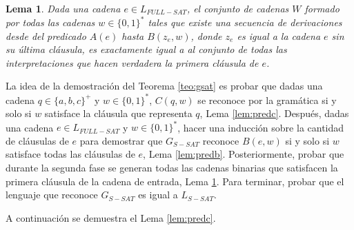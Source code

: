 \documentclass[12pt]{article}
\newtheorem{lemma}{Lema}
\begin{document}
\begin{lemma}
    \label{lem:preda}
    Dada una cadena $e\in L_{FULL-SAT}$, el conjunto de cadenas $W$ formado por todas las cadenas $w\in \{0,1\}^*$ tales que existe una secuencia de derivaciones desde del 
    predicado $A(e)$ hasta $B(z_e,w)$, donde $z_e$ es igual a la cadena $e$ sin su última cláusula, es exactamente igual a al conjunto de todas las interpretaciones que hacen 
    verdadera la primera cláusula de $e$. 
\end{lemma}

La idea de la demostración del Teorema \ref{teo:gsat} es probar que dadas una cadena $q\in \{a,b,c\}^+$ y $w\in \{0,1\}^*$, $C(q,w)$ se reconoce por la gramática si y solo si 
$w$ satisface la cláusula que representa $q$, Lema \ref{lem:predc}. Después, dadas una cadena $e\in L_{FULL-SAT}$ y $w\in \{0,1\}^*$, hacer una inducción sobre la cantidad de cláusulas
de $e$ para demostrar que $G_{S-SAT}$ reconoce $B(e,w)$
si y solo si $w$ satisface todas las cláusulas de $e$, Lema \ref{lem:predb}. Posteriormente, probar que durante la segunda fase se generan todas las cadenas binarias que satisfacen 
la primera cláusula de la cadena de entrada, Lema \ref{lem:preda}. Para terminar, probar que el lenguaje que reconoce $G_{S-SAT}$ es igual a $L_{S-SAT}$.

A continuación se demuestra el Lema \ref{lem:predc}.
\end{document}
